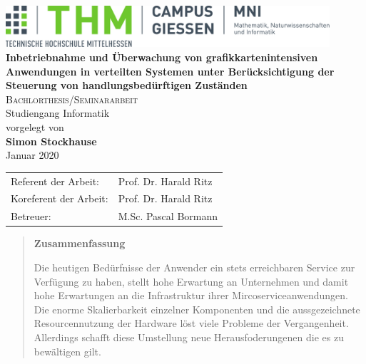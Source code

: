 \documentclass[%
	BCOR=8.25mm,         %
	DIV=12,              %
	parskip=half,				 %
	bibliography=totoc,	 %
	headsepline=on,      %
	openany
	]{scrbook}
\begin{document}
\frontmatter

\begin{titlepage}
	\begin{center}
	\includegraphics[width=0.9\textwidth]{img/mni-logo}\\[5cm]
	\textbf{\huge\sffamily Inbetriebnahme und Überwachung von grafikkartenintensiven Anwendungen in verteilten Systemen unter Berücksichtigung der Steuerung von handlungsbedürftigen Zuständen}\\[2cm]
	\textsc{\Large Bachlorthesis/Seminararbeit}\\Studiengang Informatik\\[2cm]
	vorgelegt von\\
	\textbf{Simon Stockhause}\\ [1.5cm] 
	Januar 2020
	\end{center}
	\vfill
	\center
	\begin{tabular}{ll}
		Referent der Arbeit: & Prof. Dr. Harald Ritz\\ 
		Koreferent der Arbeit: & Prof. Dr. Harald Ritz\\ 
		Betreuer: & M.Sc. Pascal Bormann\\
	\end{tabular}
\end{titlepage}
\cleardoubleemptypage

\pagestyle{empty}


\pagestyle{empty}
\begin{quote}
	\vspace*{4cm}

	\begin{center}
		\textbf{\Large\sffamily Zusammenfassung}
	\end{center}

	Die heutigen Bedürfnisse der Anwender ein stets erreichbaren Service zur Verfügung zu haben, stellt hohe Erwartung an Unternehmen und damit hohe Erwartungen an die  Infrastruktur ihrer Mircoserviceanwendungen. Die enorme Skalierbarkeit einzelner Komponenten und die aussgezeichnete Resourcennutzung der Hardware löst viele Probleme der Vergangenheit. Allerdings schafft diese Umstellung neue Herausfoderungenen die es zu bewältigen gilt. 
	
\end{quote}
\cleardoubleemptypage


\pagestyle{empty}
{
	\renewcommand{\thispagestyle}[1]{}
	\tableofcontents
}
\clearpage
\pagestyle{plain}
\pagestyle{empty}
{
	\renewcommand{\thispagestyle}[1]{}
	\listoffigures
}
\clearpage
\pagestyle{plain}

\mainmatter 
\pagestyle{headings}





\backmatter 

\appendix


\end{document}
